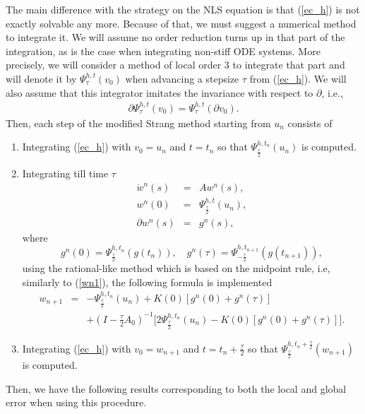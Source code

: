 \documentclass[a4paper,12pt]{article}
\begin{document}
The main difference with the strategy on the NLS equation is that (\ref{ec_h}) is not exactly solvable any more. Because of that, we must suggest a numerical method to integrate it. We will assume no order reduction turns up in that part of the integration, as is the case when integrating non-stiff ODE systems. More precisely, we will consider a method of local order $3$ to integrate that part and will denote it by $\Psi_{\tau}^{h,t}(v_0)$ when advancing a stepsize $\tau$ from (\ref{ec_h}). We will also assume that this integrator imitates the invariance with respect to $\partial$, i.e.,
\begin{eqnarray}
\partial \Psi_{\tau}^{h,t}(v_0)=\Psi_{\tau}^{h,t}(\partial v_0). \label{frontera_inv}
\end{eqnarray}
Then, each step of the modified Strang method starting from $u_n$ consists of
\begin{enumerate}
\item[1.] Integrating  (\ref{ec_h}) with $v_0=u_n$ and $t=t_n$ so that $\Psi_{\frac{\tau}{2}}^{h,t_n}(u_n)$ is computed.
\item[2.] Integrating till time $\tau$
\begin{eqnarray}
\dot{w}^n(s)&=& A w^n(s), \nonumber \\
w^n(0)&=&\Psi_{\frac{\tau}{2}}^{h,t}(u_n), \nonumber \\
\partial w^n (s)&=& g^n(s), \nonumber
\end{eqnarray}
where
$$
g^n(0)=\Psi_{\frac{\tau}{2}}^{h,t_n}(g(t_n)), \quad g^n(\tau)=\Psi_{-\frac{\tau}{2}}^{h,t_{n+1}}(g(t_{n+1})),
$$
using the rational-like method which is based on the midpoint rule, i.e, similarly to (\ref{wn1}), the following formula is implemented
\begin{eqnarray}
w_{n+1}&=&-\Psi_{\frac{\tau}{2}}^{h,t_n}(u_n)+K(0)[g^n(0)+g^n(\tau)] \nonumber \\
&&+(I-\frac{\tau}{2}A_0)^{-1}\bigg[2 \Psi_{\frac{\tau}{2}}^{h,t_n}(u_n)-K(0)[g^n(0)+g^n(\tau)]\bigg]. \nonumber
\end{eqnarray}
\item[3.] Integrating  (\ref{ec_h}) with $v_0=w_{n+1}$ and $t=t_n+\frac{\tau}{2}$ so that $\Psi_{\frac{\tau}{2}}^{h,t_n+\frac{\tau}{2}}(w_{n+1})$ is computed.
\end{enumerate}

Then, we have the following results corresponding to both the local and global error when using this procedure.
\end{document}
